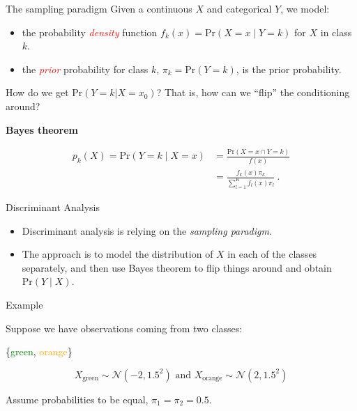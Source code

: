 \documentclass[
  10pt,
  ignorenonframetext,
]{beamer}
\begin{document}
\begin{frame}{The sampling paradigm}
\protect\hypertarget{the-sampling-paradigm}{}
Given a continuous \(X\) and categorical \(Y\), we model: \vspace{1mm}

\begin{itemize}
\item
  the probability \emph{\textcolor{red}{density}} function
  \(f_k(x) = \text{Pr}(X=x \mid Y=k)\) for \(X\) in class \(k\).
\item
  the \emph{\textcolor{red}{prior}} probability for class \(k\),
  \(\pi_k = \text{Pr}(Y=k)\), is the prior probability.
\end{itemize}

How do we get \(\text{Pr}(Y=k | X=x_0)\)? That is, how can we ``flip''
the conditioning around? \vspace{4mm}

\begin{block}{\textbf{Bayes theorem}}
\protect\hypertarget{bayes-theorem}{}
\vspace{-3mm}

\begin{align}
p_k(X) = \text{Pr}(Y=k \mid X= x) &= 
\frac{\text{Pr}(X=x \cap Y=k)}{f(x)} \nonumber\\
&= \frac{ f_k(x) \pi_k}{\sum_{l=1}^K  f_l(x) \pi_l}  \ . \label{eq:Bayes}
\end{align}
\end{block}
\end{frame}

\begin{frame}{Discriminant Analysis}
\protect\hypertarget{discriminant-analysis}{}
\vspace{2mm}

\begin{itemize}
\item
  Discriminant analysis is relying on the \emph{sampling paradigm}.
\item
  The approach is to model the distribution of \(X\) in each of the
  classes separately, and then use Bayes theorem to flip things around
  and obtain \(\text{Pr}(Y \mid X)\).
\end{itemize}

\vspace{2mm}

\begin{block}{Example}
\protect\hypertarget{example}{}
\vspace{2mm}

Suppose we have observations coming from two classes:

\{\textcolor{green}{green}, \textcolor{orange}{orange}\}

\[X_{\text{green}}\sim \mathcal{N}(-2, 1.5^2) \text{ and }
X_{\text{orange}}\sim \mathcal{N}(2, 1.5^2) \]

\vspace{2mm}

Assume probabilities to be equal, \(\pi_1 = \pi_2 = 0.5\).
\end{block}
\end{frame}
\end{document}
